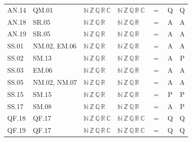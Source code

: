 {\begin{longtable}{l l l l c c c}
AN.14 & QM.01 & $\mathbb N\,\mathbb Z\,\mathbb Q\,\mathbb R\,\mathbb C$ & $\mathbb N\,\mathbb Z\,\mathbb Q\,\mathbb R\,\mathbb C$ & $=$ & Q & Q \\
AN.18 & SR.05 & $\mathbb N\,\mathbb Z\,\mathbb Q\,\mathbb R$ & $\mathbb N\,\mathbb Z\,\mathbb Q\,\mathbb R$ & $=$ & A & A \\
AN.19 & SR.05 & $\mathbb N\,\mathbb Z\,\mathbb Q\,\mathbb R$ & $\mathbb N\,\mathbb Z\,\mathbb Q\,\mathbb R$ & $=$ & A & A \\
SS.01 & NM.02, EM.06 & $\mathbb N\,\mathbb Z\,\mathbb Q\,\mathbb R$ & $\mathbb N\,\mathbb Z\,\mathbb Q\,\mathbb R$ & $=$ & A & A \\
SS.02 & SM.13 & $\mathbb N\,\mathbb Z\,\mathbb Q\,\mathbb R$ & $\mathbb N\,\mathbb Z\,\mathbb Q\,\mathbb R$ & $=$ & A & P \\
SS.03 & EM.06 & $\mathbb N\,\mathbb Z\,\mathbb Q\,\mathbb R$ & $\mathbb N\,\mathbb Z\,\mathbb Q\,\mathbb R$ & $=$ & A & A \\
SS.05 & NM.02, NM.07 & $\mathbb N\,\mathbb Z\,\mathbb Q\,\mathbb R$ & $\mathbb N\,\mathbb Z\,\mathbb Q\,\mathbb R$ & $=$ & A & A \\
SS.15 & SM.15 & $\mathbb N\,\mathbb Z\,\mathbb Q\,\mathbb R$ & $\mathbb N\,\mathbb Z\,\mathbb Q\,\mathbb R$ & $=$ & P & P \\
SS.17 & SM.08 & $\mathbb N\,\mathbb Z\,\mathbb Q\,\mathbb R$ & $\mathbb N\,\mathbb Z\,\mathbb Q\,\mathbb R$ & $=$ & A & P \\
QF.18 & QF.17 & $\mathbb N\,\mathbb Z\,\mathbb Q\,\mathbb R\,\mathbb C$ & $\mathbb N\,\mathbb Z\,\mathbb Q\,\mathbb R\,\mathbb C$ & $=$ & Q & Q \\
QF.19 & QF.17 & $\mathbb N\,\mathbb Z\,\mathbb Q\,\mathbb R\,\mathbb C$ & $\mathbb N\,\mathbb Z\,\mathbb Q\,\mathbb R\,\mathbb C$ & $=$ & Q & Q \\
\end{longtable}
}
